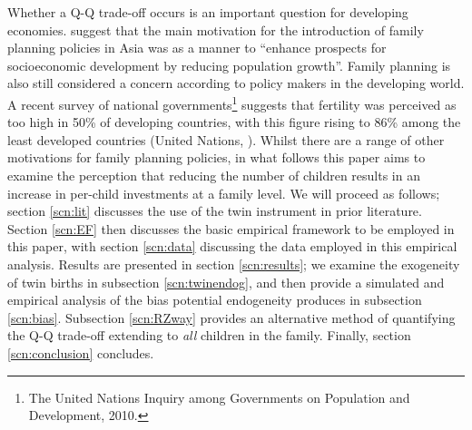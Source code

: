 \documentclass{article}[11pt,subeqn]
\begin{document}
\begin{spacing}{1.5}
Whether a Q-Q trade-off occurs is an important question for developing economies.  \citet{Clelandetal2006} suggest that the main motivation for the 
introduction of family planning policies in Asia was as a manner to ``enhance prospects for socioeconomic development by reducing population growth''.  
Family planning is also still considered a concern according to policy makers in the developing world.  A recent survey of national governments\footnote{
The United Nations Inquiry among Governments on Population and Development, 2010.} suggests that fertility was perceived as too high in 50\% of 
developing countries, with this figure rising to 86\% among the least developed countries (United Nations, \citeyear{UN2010}).   Whilst there are a 
range of other motivations for family planning policies, in what follows this paper aims to examine the perception that reducing the number of children 
results in an increase in per-child investments at a family level.  We will proceed as follows; section \ref{scn:lit} discusses the use of the twin instrument in 
prior literature.  Section \ref{scn:EF} then discusses the basic empirical framework to be employed in this paper, with section \ref{scn:data} discussing the 
data employed in this empirical analysis.  Results are presented in section \ref{scn:results}; we examine the exogeneity of twin births in subsection 
\ref{scn:twinendog}, and then provide a simulated and empirical analysis of the bias potential endogeneity produces in subsection \ref{scn:bias}. Subsection 
\ref{scn:RZway} provides an alternative method of quantifying the Q-Q trade-off extending to \emph{all} children in the family.  Finally, section 
\ref{scn:conclusion} concludes. 


\end{spacing}
\end{document}
